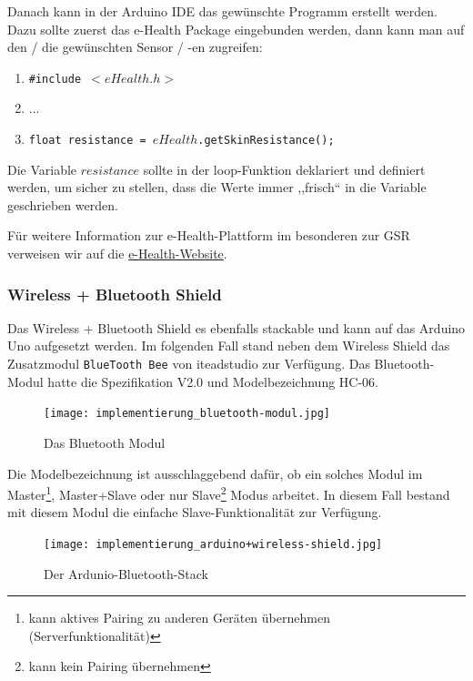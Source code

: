 	Danach kann in der Arduino IDE das gewünschte Programm erstellt werden. Dazu sollte zuerst das e-Health Package eingebunden werden, dann kann man auf den / die gewünschten Sensor / -en zugreifen:
	
	\begin{enumerate}
	 \item \texttt{\#include $ <eHealth.h> $}
	 \item ...
	 \item \texttt{float resistance = $eHealth$.getSkinResistance();}
	 \end{enumerate} 
	 
	 Die Variable $resistance$ sollte in der loop-Funktion deklariert und definiert werden, um sicher zu stellen, dass die Werte immer ,,frisch`` in die Variable geschrieben werden.
	 
	 Für weitere Information zur e-Health-Plattform im besonderen zur GSR verweisen wir auf die \href{http://www.cooking-hacks.com/documentation/tutorials/ehealth-biometric-sensor-platform-arduino-raspberry-pi-medical\#step4\_7}{e-Health-Website}.
	
	\subsubsection{Wireless + Bluetooth Shield}
	
	Das Wireless + Bluetooth Shield es ebenfalls stackable und kann auf das Arduino Uno aufgesetzt werden. 
	Im folgenden Fall stand neben dem Wireless Shield das Zusatzmodul \texttt{BlueTooth Bee} von iteadstudio zur Verfügung. Das Bluetooth-Modul hatte die Spezifikation V2.0 und Modelbezeichnung HC-06. 
	
		\begin{figure}[hbtp]
		\centering
		\texttt{[image: implementierung\_bluetooth-modul.jpg]}
		\caption{Das Bluetooth Modul}
		\label{fig:Bluetooth-Modul}
		\end{figure}
		
	
	Die Modelbezeichnung ist ausschlaggebend dafür, ob ein solches Modul im Master\footnote{kann aktives Pairing zu anderen Geräten übernehmen (Serverfunktionalität)}, Master+Slave oder nur Slave\footnote{kann kein Pairing übernehmen} Modus arbeitet. In diesem Fall bestand mit diesem Modul die einfache Slave-Funktionalität zur Verfügung.
	
	\begin{figure}[hbtp]
	\centering
	\texttt{[image: implementierung\_arduino+wireless-shield.jpg]}
	\caption{Der Ardunio-Bluetooth-Stack}
	\label{fig:Arduino-Bluetooth-Stack}
	\end{figure}
	
